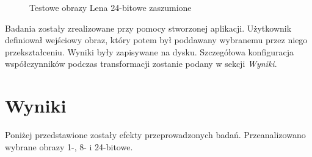 \documentclass{classrep}
\begin{document}
\begin{itemize}
\begin{figure}
    \qquad
    \qquad
    \qquad
    \qquad
    \caption{Testowe obrazy Lena 24-bitowe zaszumione}%
\end{figure}
\end{itemize}

Badania zostały zrealizowane przy pomocy stworzonej aplikacji. Użytkownik definiował wejściowy obraz, który potem był poddawany wybranemu przez niego przekształceniu. Wyniki były zapisywane na dysku. Szczegółowa konfiguracja współczynników podczas transformacji zostanie podany w sekcji \textit{Wyniki}.

\section{Wyniki}
Poniżej przedstawione zostały efekty przeprowadzonych badań. Przeanalizowano wybrane obrazy 1-, 8- i 24-bitowe.
\end{document}
